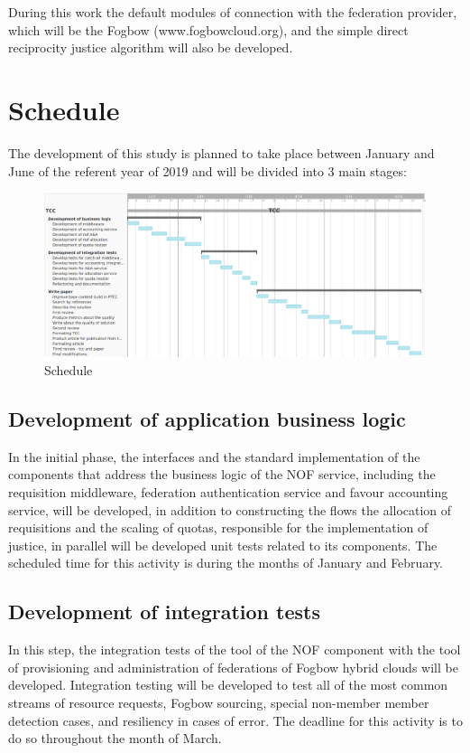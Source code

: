 \documentclass{article}
\begin{document}
During this work the default modules of connection with the federation provider, which will be the Fogbow (www.fogbowcloud.org), and the simple direct reciprocity justice algorithm will also be developed.

\section{Schedule}

The development of this study is planned to take place between January and June of the referent year of 2019 and will be divided into 3 main stages:

\begin{figure}
    \centering
    \includegraphics[scale=0.35]{./image/TCC-schedule.png}
    \caption{Schedule}
\end{figure}

\subsection{Development of application business logic}
	In the initial phase, the interfaces and the standard implementation of the components that address the business logic of the NOF service, including the requisition middleware, federation authentication service and favour accounting service, will be developed, in addition to constructing the flows the allocation of requisitions and the scaling of quotas, responsible for the implementation of justice, in parallel will be developed unit tests related to its components. The scheduled time for this activity is during the months of January and February.
\subsection{Development of integration tests}
    In this step, the integration tests of the tool of the NOF component with the tool of provisioning and administration of federations of Fogbow hybrid clouds will be developed. Integration testing will be developed to test all of the most common streams of resource requests, Fogbow sourcing, special non-member member detection cases, and resiliency in cases of error. The deadline for this activity is to do so throughout the month of March.
\end{document}
